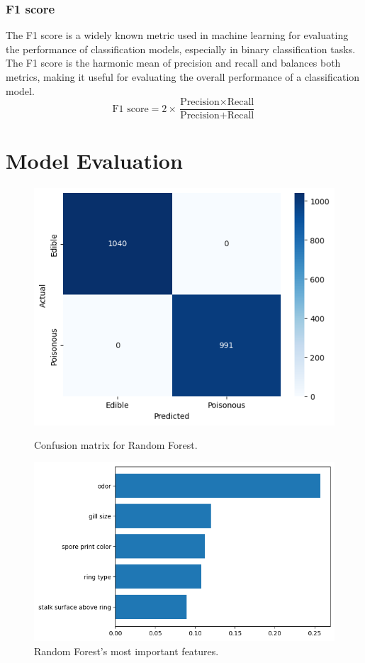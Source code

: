 \documentclass[11pt, conference]{IEEEtran}
\begin{document}
    \subsubsection{F1 score}
    The F1 score is a widely known metric used in machine learning for evaluating the performance of classification models, especially in binary classification tasks. The F1 score is the harmonic mean of precision and recall and balances both metrics, making it useful for evaluating the overall performance of a classification model.
    \begin{equation}
        \text{F1 score} = 2 \times \frac{\text{Precision} \times \text{Recall}}{\text{Precision} + \text{Recall}}\label{eq4}
    \end{equation}

\section{Model Evaluation}
    \begin{figure}[htbp]
        \centering
        \begin{minipage}{0.5\textwidth}
            \centering
            \includegraphics[width=0.75\linewidth]{plot/matrix/randomforest.png}
            \caption{Confusion matrix for Random Forest.}
            \label{fig:plot5}
        \end{minipage}%
        \begin{minipage}{0.5\textwidth}
            \centering
            \includegraphics[width=1\linewidth]{plot/count/rf_importance.png}
            \caption{Random Forest's most important features.}
            \label{fig:plot6}
        \end{minipage}
    \end{figure}
    
\end{document}
